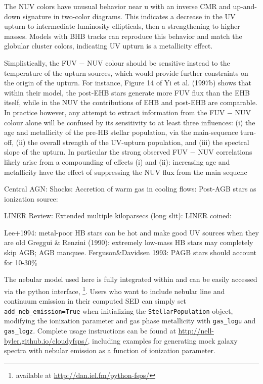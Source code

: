\citet{Schombert} The NUV colors have unusual behavior near u with an inverse CMR and up-and-down signature in two-color diagrams. This indicates a decrease in the UV upturn to intermediate luminosity ellipticals, then a strengthening to higher masses. Models with BHB tracks can reproduce this behavior and match the globular cluster colors, indicating UV upturn is a metallicity effect.

Simplistically, the FUV − NUV colour should be sensitive instead to the temperature of the upturn sources, which would provide further constraints on the origin of the upturn. For instance, Figure 14 of Yi et al. (1997b) shows that within their model, the post-EHB stars generate more FUV flux than the EHB itself, while in the NUV the contributions of EHB and post-EHB are comparable.
In practice however, any attempt to extract information from the FUV − NUV colour alone will be confused by its sensitivity to at least three influences: (i) the age and metallicity of the pre-HB stellar population, via the main-sequence turn-off, (ii) the overall strength of the UV-upturn population, and (iii) the spectral slope of the upturn. In particular the strong observed FUV − NUV correlations likely arise from a compounding of effects (i) and (ii): increasing age and metallicity have the effect of suppressing the NUV flux from the main sequenc

Central AGN: \citet{Ferland+1983, Halpern+1983, Ho+1999, Kewley+2006, Ho+2009}
Shocks: \citet{Koski+1976, Dopita+1995, Allen+2008}
Accretion of warm gas in cooling flows: \citet{Heckman+1981}
Post-AGB stars as ionization source: \citet{Binette+1994, Taniguchi+2000}

LINER Review: \citet{Filippenko+2003}
Extended multiple kiloparsecs (long slit): \citet{Goudfrooij+1994, Maccehetto+1996}
LINER coined: \citet{Heckman+1980}

Lee+1994: metal-poor HB stars can be hot and make good UV sources when they are old
Greggui & Renzini (1990): extremely low-mass HB stars may completely skip AGB; AGB manquee.
Ferguson&Davidsen 1993: PAGB stars should account for 10-30\%


The nebular model used here is fully integrated within \FSPS and can be easily accessed via the python interface, \pFSPS\footnote{available at \url{http://dan.iel.fm/python-fsps/}}. Users who want to include nebular line and continuum emission in their computed SED can simply set {\tt add\_neb\_emission=True} when initializing the {\tt StellarPopulation} object, modifying the ionization parameter and gas phase metallicity with {\tt gas\_logu} and {\tt gas\_logz}. Complete usage instructions can be found at \url{http://nell-byler.github.io/cloudyfsps/}, including examples for generating mock galaxy spectra with nebular emission as a function of ionization parameter.

